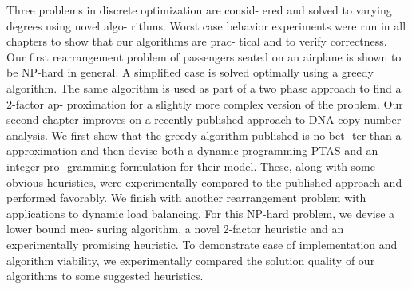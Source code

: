 Three problems in discrete optimization are consid-
ered and solved to varying degrees using novel algo-
rithms. Worst case behavior experiments were run
in all chapters to show that our algorithms are prac-
tical and to verify correctness.
Our first rearrangement problem of passengers
seated on an airplane is shown to be NP-hard in
general. A simplified case is solved optimally using
a greedy algorithm. The same algorithm is used as
part of a two phase approach to find a 2-factor ap-
proximation for a slightly more complex version of
the problem.
Our second chapter improves on a recently published
approach to DNA copy number analysis. We first
show that the greedy algorithm published is no bet-
ter than a approximation and then devise both a
dynamic programming PTAS and an integer pro-
gramming formulation for their model. These, along
with some obvious heuristics, were experimentally
compared to the published approach and performed
favorably.
We finish with another rearrangement problem with
applications to dynamic load balancing. For this
NP-hard problem, we devise a lower bound mea-
suring algorithm, a novel 2-factor heuristic and an
experimentally promising heuristic. To demonstrate
ease of implementation and algorithm viability, we
experimentally compared the solution quality of our
algorithms to some suggested heuristics.
